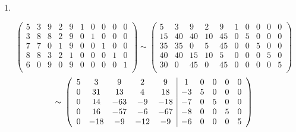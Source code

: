 \documentclass[10pt,a4paper]{article}
\begin{document}
1.

\begin{equation*}
  \left(
  \begin{array}{ccccc|ccccc}
5 & 3 & 9 & 2 & 9 & 1 & 0 & 0 & 0 & 0\\ 
3 & 8 & 8 & 2 & 9 & 0 & 1 & 0 & 0 & 0\\ 
7 & 7 & 0 & 1 & 9 & 0 & 0 & 1 & 0 & 0\\ 
8 & 8 & 3 & 2 & 1 & 0 & 0 & 0 & 1 & 0\\ 
6 & 0 & 9 & 0 & 9 & 0 & 0 & 0 & 0 & 1\\ 
  \end{array}
  \right)
  \sim
  \left(
   \begin{array}{ccccc|ccccc}
5 & 3 & 9 & 2 & 9 & 1 & 0 & 0 & 0 & 0\\ 
15 & 40 & 40 & 10 & 45 & 0 & 5 & 0 & 0 & 0\\ 
35 & 35 & 0 & 5 & 45 & 0 & 0 & 5 & 0 & 0\\ 
40 & 40 & 15 & 10 & 5 & 0 & 0 & 0 & 5 & 0\\ 
30 & 0 & 45 & 0 & 45 & 0 & 0 & 0 & 0 & 5\\ 
  \end{array}
  \right)
\end{equation*}
\begin{equation*}
    \sim
    \\
    \left(
   \begin{array}{ccccc|ccccc}
5 & 3 & 9 & 2 & 9 & 			1 & 0 & 0 & 0 & 0\\ 
0 & 31 & 13 & 4 & 18 & 		-3 & 5 & 0 & 0 & 0\\ 
0 & 14 & -63 & -9 & -18 &	-7 & 0 & 5 & 0 & 0\\ 
0 & 16 & -57 & -6 & -67 & 	-8 & 0 & 0 & 5 & 0\\ 
0 & -18 & -9 & -12 & -9 & 	-6 & 0 & 0 & 0 & 5\\ 
  \end{array}
  \right)
\end{equation*}
\end{document}
